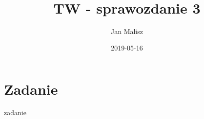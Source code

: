 \documentclass[10pt,a4paper]{article}
\title{TW - sprawozdanie 3}
\author{Jan Malisz}
\date{2019-05-16}
\begin{document}
  \maketitle
  \thispagestyle{empty}
  \newpage

  \section*{Zadanie}\label{sec:Zadanie}
  {zadanie}
\end{document}
